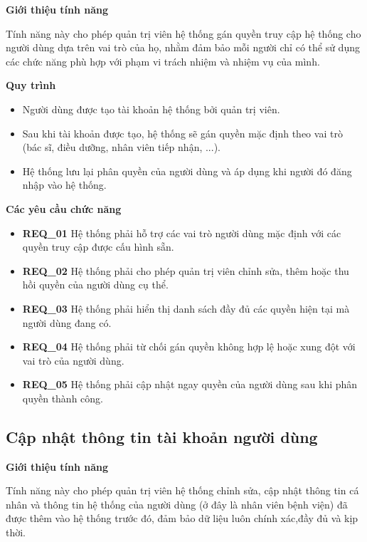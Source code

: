 \noindent \textbf{Giới thiệu tính năng}

Tính năng này cho phép quản trị viên hệ thống gán quyền truy cập hệ thống cho người dùng dựa trên vai trò của họ, nhằm đảm bảo mỗi người chỉ có thể sử dụng các chức năng phù hợp với phạm vi trách nhiệm và nhiệm vụ của mình.

\noindent \textbf{Quy trình}

\begin{itemize}
  \item Người dùng được tạo tài khoản hệ thống bởi quản trị viên.

  \item Sau khi tài khoản được tạo, hệ thống sẽ gán quyền mặc định theo vai trò (bác sĩ, điều dưỡng, nhân viên tiếp nhận, ...).

  \item Hệ thống lưu lại phân quyền của người dùng và áp dụng khi người đó đăng nhập vào hệ thống.
\end{itemize}

\noindent \textbf{Các yêu cầu chức năng}

\begin{itemize}
  \item \textbf{REQ\_01} Hệ thống phải hỗ trợ các vai trò người dùng mặc định với các quyền truy cập được cấu hình sẵn.

  \item \textbf{REQ\_02} Hệ thống phải cho phép quản trị viên chỉnh sửa, thêm hoặc thu hồi quyền của người dùng cụ thể.

  \item \textbf{REQ\_03} Hệ thống phải hiển thị danh sách đầy đủ các quyền hiện tại mà người dùng đang có.

  \item \textbf{REQ\_04} Hệ thống phải từ chối gán quyền không hợp lệ hoặc xung đột với vai trò của người dùng.

  \item \textbf{REQ\_05} Hệ thống phải cập nhật ngay quyền của người dùng sau khi phân quyền thành công.
\end{itemize}

\subsection{Cập nhật thông tin tài khoản người dùng}

\noindent \textbf{Giới thiệu tính năng}

Tính năng này cho phép quản trị viên hệ thống chỉnh sửa, cập nhật thông tin cá nhân và thông tin hệ thống của người dùng (ở đây là nhân viên bệnh viện) đã được thêm vào hệ thống trước đó, đảm bảo dữ liệu luôn chính xác,đầy đủ và kịp thời.

